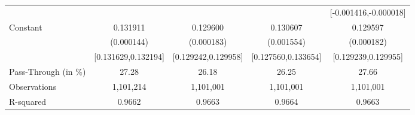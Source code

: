 {\begin{tabular}{l*{4}{c}}
                    &                     &                     &                     &[-0.001416,-0.000018]         \\
Constant            &    0.131911\sym{***}&    0.129600\sym{***}&    0.130607\sym{***}&    0.129597\sym{***}\\
                    &  (0.000144)         &  (0.000183)         &  (0.001554)         &  (0.000182)         \\
                    &[0.131629,0.132194]         &[0.129242,0.129958]         &[0.127560,0.133654]         &[0.129239,0.129955]         \\
\midrule
Pass-Through (in \%)&       27.28         &       26.18         &       26.25         &       27.66         \\
Observations        &   1,101,214         &   1,101,001         &   1,101,001         &   1,101,001         \\
R-squared           &      0.9662         &      0.9663         &      0.9664         &      0.9663         \\
\bottomrule
\end{tabular}
}
